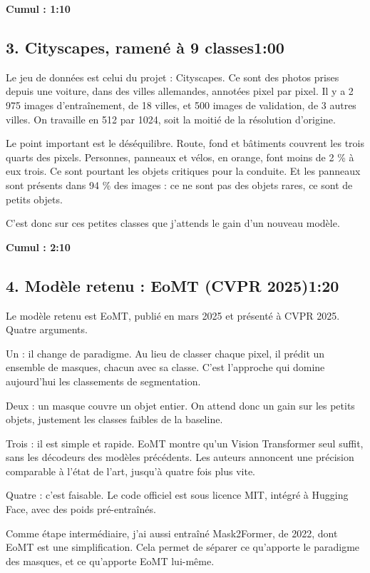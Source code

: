 \documentclass[11pt,a4paper]{article}
\newcommand{\cumul}[1]{\par{\hfill\small\color{accent}\bfseries #1}\par}
\newcommand{\tempo}[1]{\hfill{\normalsize\color{accent}#1}}
\begin{document}
\cumul{Cumul : 1:10}

\subsection*{3. Cityscapes, ramené à 9 classes\tempo{1:00}}

Le jeu de données est celui du projet : Cityscapes. Ce sont des photos prises depuis une voiture, dans des villes allemandes, annotées pixel par pixel. Il y a 2 975 images d'entraînement, de 18 villes, et 500 images de validation, de 3 autres villes. On travaille en 512 par 1024, soit la moitié de la résolution d'origine.

Le point important est le déséquilibre. Route, fond et bâtiments couvrent les trois quarts des pixels. Personnes, panneaux et vélos, en orange, font moins de 2 \% à eux trois. Ce sont pourtant les objets critiques pour la conduite. Et les panneaux sont présents dans 94 \% des images : ce ne sont pas des objets rares, ce sont de petits objets.

C'est donc sur ces petites classes que j'attends le gain d'un nouveau modèle.

\cumul{Cumul : 2:10}

\subsection*{4. Modèle retenu : EoMT (CVPR 2025)\tempo{1:20}}

Le modèle retenu est EoMT, publié en mars 2025 et présenté à CVPR 2025. Quatre arguments.

Un : il change de paradigme. Au lieu de classer chaque pixel, il prédit un ensemble de masques, chacun avec sa classe. C'est l'approche qui domine aujourd'hui les classements de segmentation.

Deux : un masque couvre un objet entier. On attend donc un gain sur les petits objets, justement les classes faibles de la baseline.

Trois : il est simple et rapide. EoMT montre qu'un Vision Transformer seul suffit, sans les décodeurs des modèles précédents. Les auteurs annoncent une précision comparable à l'état de l'art, jusqu'à quatre fois plus vite.

Quatre : c'est faisable. Le code officiel est sous licence MIT, intégré à Hugging Face, avec des poids pré-entraînés.

Comme étape intermédiaire, j'ai aussi entraîné Mask2Former, de 2022, dont EoMT est une simplification. Cela permet de séparer ce qu'apporte le paradigme des masques, et ce qu'apporte EoMT lui-même.
\end{document}
